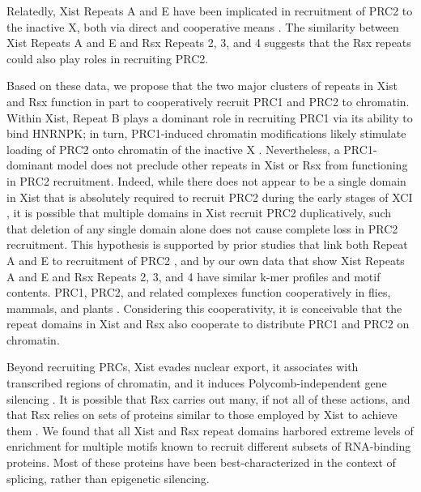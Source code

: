 Relatedly, Xist Repeats A and E have been implicated in recruitment of PRC2 to the inactive X, both via direct and cooperative means \cite{Almeida2017PCGF3/5-PRC1Inactivation,Cifuentes-Rojas2014Regulatory2,Davidovich2015TowardRNA,Kohlmaier2004AInactivation,Ridings-Figueroa2017TheTerritory,Sunwoo2017RepeatCIZ1,Wang2017TargetingGuanines,Zhao2008PolycombChromosome}. The similarity between Xist Repeats A and E and Rsx Repeats 2, 3, and 4 suggests that the Rsx repeats could also play roles in recruiting PRC2. 

Based on these data, we propose that the two major clusters of repeats in Xist and Rsx function in part to cooperatively recruit PRC1 and PRC2 to chromatin. Within Xist, Repeat B plays a dominant role in recruiting PRC1 via its ability to bind HNRNPK; in turn, PRC1-induced chromatin modifications likely stimulate loading of PRC2 onto chromatin of the inactive X \cite{Almeida2017PCGF3/5-PRC1Inactivation,Pintacuda2017HnRNPKSilencing}. Nevertheless, a PRC1-dominant model does not preclude other repeats in Xist or Rsx from functioning in PRC2 recruitment. Indeed, while there does not appear to be a single domain in Xist that is absolutely required to recruit PRC2 during the early stages of XCI \cite{Kohlmaier2004AInactivation,Wutz2002ChromosomalRNA}, it is possible that multiple domains in Xist recruit PRC2 duplicatively, such that deletion of any single domain alone does not cause complete loss in PRC2 recruitment. This hypothesis is supported by prior studies that link both Repeat A and E to recruitment of PRC2 \cite{Almeida2017PCGF3/5-PRC1Inactivation,Cifuentes-Rojas2014Regulatory2,Davidovich2015TowardRNA,Kohlmaier2004AInactivation,Ridings-Figueroa2017TheTerritory,Sunwoo2017RepeatCIZ1,Wang2017TargetingGuanines,Zhao2008PolycombChromosome}, and by our own data that show Xist Repeats A and E and Rsx Repeats 2, 3, and 4 have similar k-mer profiles and motif contents. PRC1, PRC2, and related complexes function cooperatively in flies, mammals, and plants \cite{Blackledge2015TargetingStory,Li2018Polycomb-mediatedPlants,Schuettengruber2014CooperativityDrosophila}. Considering this cooperativity, it is conceivable that the repeat domains in Xist and Rsx also cooperate to distribute PRC1 and PRC2 on chromatin.

Beyond recruiting PRCs, Xist evades nuclear export, it associates with transcribed regions of chromatin, and it induces Polycomb-independent gene silencing \cite{Balaton2018TheChromosome,Brockdorff2018LocalNcRNA,Sahakyan2018TheCompensation}. It is possible that Rsx carries out many, if not all of these actions, and that Rsx relies on sets of proteins similar to those employed by Xist to achieve them \cite{Grant2012RsxInactivation,Wang2014Chromosome-wideDomestica}. We found that all Xist and Rsx repeat domains harbored extreme levels of enrichment for multiple motifs known to recruit different subsets of RNA-binding proteins. Most of these proteins have been best-characterized in the context of splicing, rather than epigenetic silencing.

